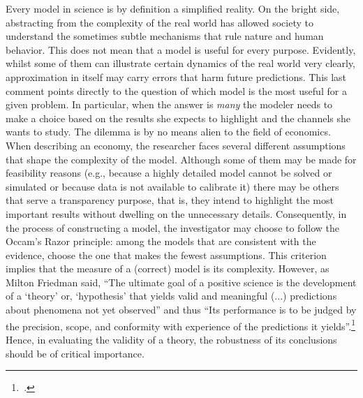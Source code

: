 \documentclass[english, a4paper, 12pt]{article}
\begin{document}
Every model in science is by definition a simplified reality. On the bright side, abstracting from the complexity of the real world has allowed society to understand the sometimes subtle mechanisms that rule nature and human behavior. This does not mean that a model is useful for every purpose. Evidently, whilst some of them can illustrate certain dynamics of the real world very clearly, approximation in itself may carry errors that harm future predictions. This last comment points directly to the question of which model is the most useful for a given problem. In particular, when the answer is \textit{many} the modeler needs to make a choice based on the results she expects to highlight and the channels she wants to study. The dilemma is by no means alien to the field of economics. When describing an economy, the researcher faces several different assumptions that shape the complexity of the model. Although some of them may be made for feasibility reasons (e.g., because a highly detailed model cannot be solved or simulated or because data is not available to calibrate it) there may be others that serve a transparency purpose, that is, they intend to highlight the most important results without dwelling on the unnecessary details. Consequently, in the process of constructing a model, the investigator may choose to follow the Occam's Razor principle: among the models that are consistent with the evidence, choose the one that makes the fewest assumptions. This criterion implies that the measure of a (correct) model is its complexity. However, as Milton Friedman said, ``The ultimate goal of a positive science is the development of a `theory' or, `hypothesis' that yields valid and meaningful (...) predictions about phenomena not yet observed'' and thus ``Its performance is to be judged by the precision, scope, and conformity with experience of the predictions it yields''.\footnote{\,\cite{FriedmanPositive}.} Hence, in evaluating the validity of a theory, the robustness of its conclusions should be of critical importance.
\end{document}
